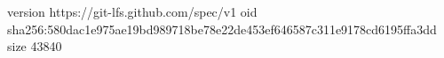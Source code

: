 version https://git-lfs.github.com/spec/v1
oid sha256:580dac1e975ae19bd989718be78e22de453ef646587c311e9178cd6195ffa3dd
size 43840

